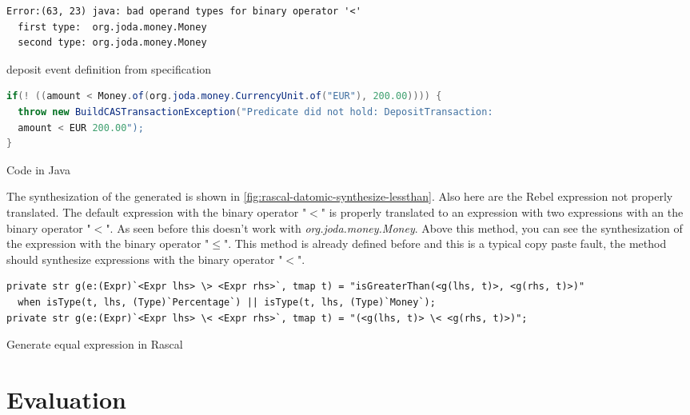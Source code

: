 \begin{sourcecode}[h!]
\begin{lstlisting}[]
Error:(63, 23) java: bad operand types for binary operator '<'
  first type:  org.joda.money.Money
  second type: org.joda.money.Money
\end{lstlisting}
\caption{deposit event definition from specification}
\label{fig:java-result-lessthan-compile-error}
\end{sourcecode}

\begin{sourcecode}[h!]
\begin{lstlisting}[language=Java]
if(! ((amount < Money.of(org.joda.money.CurrencyUnit.of("EUR"), 200.00)))) {
  throw new BuildCASTransactionException("Predicate did not hold: DepositTransaction:
  amount < EUR 200.00");
}
\end{lstlisting}
\caption{Code in Java}
\label{fig:java-lessthan-compile-error}
\end{sourcecode}

The synthesization of the generated is shown in
\autoref{fig:rascal-datomic-synthesize-lessthan}. Also here are the Rebel
expression not properly translated. The default expression with the binary
operator "$<$" is properly translated to an expression with two expressions with
 an the binary operator "$<$". As seen before this doesn't work with
 \textit{org.joda.money.Money}. Above this method, you can see the
 synthesization of the expression with the binary operator "$\leq$". This method
 is already defined before and this is a typical copy paste fault, the method
 should synthesize expressions with the binary operator "$<$".


\begin{sourcecode}[h!]
\begin{lstlisting}[]
private str g(e:(Expr)`<Expr lhs> \> <Expr rhs>`, tmap t) = "isGreaterThan(<g(lhs, t)>, <g(rhs, t)>)"
  when isType(t, lhs, (Type)`Percentage`) || isType(t, lhs, (Type)`Money`);
private str g(e:(Expr)`<Expr lhs> \< <Expr rhs>`, tmap t) = "(<g(lhs, t)> \< <g(rhs, t)>)";
\end{lstlisting}
\caption{Generate equal expression in Rascal}
\label{fig:rascal-datomic-synthesize-lessthan}
\end{sourcecode}

\section{Evaluation}
\label{sec:ch4-evaluation}

